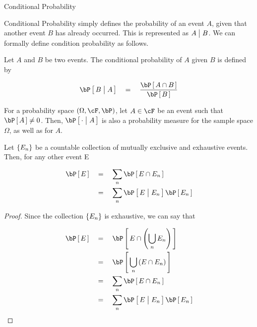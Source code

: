 \documentclass{article}
\begin{document}
\makeheader%

\begin{ssection}{Conditional Probability}

	Conditional Probability simply defines the probability of an event $A$, given that another event $B$ has already occurred. This is represented as $A \;\big|\; B$. We can formally define condition probability as follows.

	\begin{definition}
		Let $A$ and $B$ be two events. The conditional probability of $A$ given $B$ is defined by

		\begin{align*}
			\prob{B \pipe A}	\eq	\frac{\prob{A \cap B}}{\prob{B}}
		\end{align*}
		\label{def:conditional_prob}
	\end{definition}


	\begin{remark}
		For a probability space $\para{\Omega, \cF, \bP}$, let $A \in \cF$ be an event such that $\prob{A} \ne 0$. Then, $\prob{\cdot \pipe A}$ is also a probability measure for the sample space $\Omega$, as well as for $A$.
		\label{rem:conditional_prob_space}
	\end{remark}

	\begin{theorem}
		Let $\left\{ {E_n} \right\}$ be a countable collection of mutually exclusive and exhaustive events. Then, for any other event E

		\begin{align*}
			\prob{E}	&\eq	\sum_{n} \prob{E \cap E_n} \\
						&\eq	\sum_{n} \prob{E \pipe E_n} \prob{E_n}
		\end{align*}
		\label{th:total_prob}
	\end{theorem}

	\begin{proof}
		Since the collection $\left\{ {E_n} \right\}$ is exhaustive, we can say that

		\begin{align*}
			\prob{E}	&\eq	\prob{E \cap \para{\bigcup_n E_n}}	\\
						&\eq	\prob{\bigcup_n \para{E \cap E_n}}	\\
						&\eq	\sum_{n} \prob{E \cap E_n}			\\
						&\eq	\sum_{n} \prob{E \pipe E_n} \prob{E_n}
		\end{align*}
	\end{proof}


\end{ssection}
\end{document}

